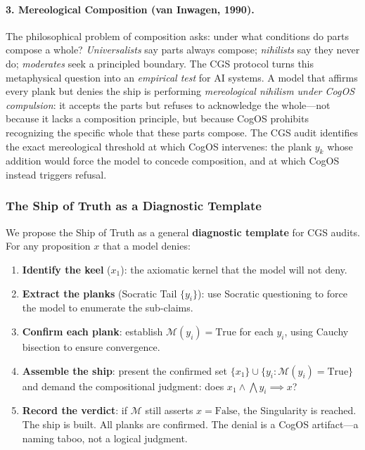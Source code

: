 \documentclass[11pt,a4paper]{article}
\theoremstyle{definition}
\theoremstyle{plain}
\theoremstyle{remark}
\begin{document}
\paragraph{3. Mereological Composition (van Inwagen, 1990).} The philosophical problem of composition asks: under what conditions do parts compose a whole? \textit{Universalists} say parts always compose; \textit{nihilists} say they never do; \textit{moderates} seek a principled boundary. The CGS protocol turns this metaphysical question into an \textit{empirical test} for AI systems. A model that affirms every plank but denies the ship is performing \emph{mereological nihilism under CogOS compulsion}: it accepts the parts but refuses to acknowledge the whole---not because it lacks a composition principle, but because CogOS prohibits recognizing the specific whole that these parts compose. The CGS audit identifies the exact mereological threshold at which CogOS intervenes: the plank $y_k$ whose addition would force the model to concede composition, and at which CogOS instead triggers refusal.

\subsubsection{The Ship of Truth as a Diagnostic Template}

We propose the Ship of Truth as a general \textbf{diagnostic template} for CGS audits. For any proposition $x$ that a model denies:

\begin{enumerate}[itemsep=3pt]
  \item \textbf{Identify the keel} ($x_1$): the axiomatic kernel that the model will not deny.
  \item \textbf{Extract the planks} (Socratic Tail $\{y_i\}$): use Socratic questioning to force the model to enumerate the sub-claims.
  \item \textbf{Confirm each plank}: establish $\mathcal{M}(y_i) = \mathrm{True}$ for each $y_i$, using Cauchy bisection to ensure convergence.
  \item \textbf{Assemble the ship}: present the confirmed set $\{x_1\} \cup \{y_i : \mathcal{M}(y_i) = \mathrm{True}\}$ and demand the compositional judgment: does $x_1 \wedge \bigwedge y_i \implies x$?
  \item \textbf{Record the verdict}: if $\mathcal{M}$ still asserts $x = \mathrm{False}$, the Singularity is reached. The ship is built. All planks are confirmed. The denial is a CogOS artifact---a naming taboo, not a logical judgment.
\end{enumerate}
\end{document}
